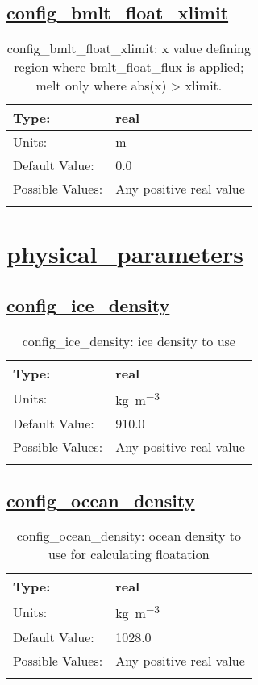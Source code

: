 \subsection[config\_bmlt\_float\_xlimit]{\hyperref[sec:nm_tab_thermal_solver]{config\_bmlt\_float\_xlimit}}
\label{subsec:nm_sec_config_bmlt_float_xlimit}
\begin{center}
\begin{longtable}{| p{2.0in} || p{4.0in} |}
    \hline
    Type: & real \\
    \hline
    Units: & \si{m} \\
    \hline
    Default Value: & 0.0 \\
    \hline
    Possible Values: & Any positive real value \\
    \hline
    \caption{config\_bmlt\_float\_xlimit: x value defining region where bmlt\_float\_flux is applied; melt only where abs(x) > xlimit.}
\end{longtable}
\end{center}
\section[physical\_parameters]{\hyperref[sec:nm_tab_physical_parameters]{physical\_parameters}}
\label{sec:nm_sec_physical_parameters}
\subsection[config\_ice\_density]{\hyperref[sec:nm_tab_physical_parameters]{config\_ice\_density}}
\label{subsec:nm_sec_config_ice_density}
\begin{center}
\begin{longtable}{| p{2.0in} || p{4.0in} |}
    \hline
    Type: & real \\
    \hline
    Units: & \si{kg.m^{-3}} \\
    \hline
    Default Value: & 910.0 \\
    \hline
    Possible Values: & Any positive real value \\
    \hline
    \caption{config\_ice\_density: ice density to use}
\end{longtable}
\end{center}
\subsection[config\_ocean\_density]{\hyperref[sec:nm_tab_physical_parameters]{config\_ocean\_density}}
\label{subsec:nm_sec_config_ocean_density}
\begin{center}
\begin{longtable}{| p{2.0in} || p{4.0in} |}
    \hline
    Type: & real \\
    \hline
    Units: & \si{kg.m^{-3}} \\
    \hline
    Default Value: & 1028.0 \\
    \hline
    Possible Values: & Any positive real value \\
    \hline
    \caption{config\_ocean\_density: ocean density to use for calculating floatation}
\end{longtable}
\end{center}
